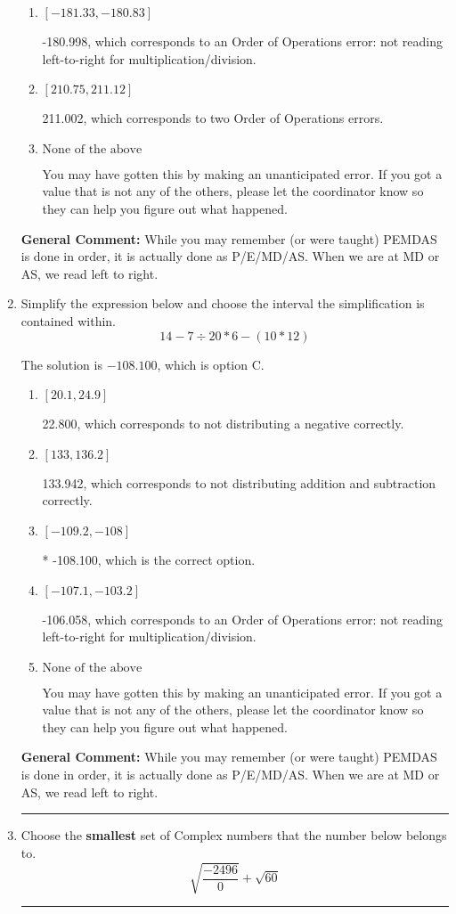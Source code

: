 \documentclass{extbook}[14pt]
\newcommand{\litem}[1]{\item #1

\rule{\textwidth}{0.4pt}}
\begin{document}
\begin{enumerate}
{\begin{enumerate}[label=\Alph*.]
* -180.338, this is the correct option
\item \( [-181.33, -180.83] \)

 -180.998, which corresponds to an Order of Operations error: not reading left-to-right for multiplication/division.
\item \( [210.75, 211.12] \)

 211.002, which corresponds to two Order of Operations errors.
\item \( \text{None of the above} \)

 You may have gotten this by making an unanticipated error. If you got a value that is not any of the others, please let the coordinator know so they can help you figure out what happened.
\end{enumerate}

\textbf{General Comment:} While you may remember (or were taught) PEMDAS is done in order, it is actually done as P/E/MD/AS. When we are at MD or AS, we read left to right.
}
\litem{
Simplify the expression below and choose the interval the simplification is contained within.
\[ 14 - 7 \div 20 * 6 - (10 * 12) \]

The solution is \( -108.100 \), which is option C.\begin{enumerate}[label=\Alph*.]
\item \( [20.1, 24.9] \)

 22.800, which corresponds to not distributing a negative correctly.
\item \( [133, 136.2] \)

 133.942, which corresponds to not distributing addition and subtraction correctly.
\item \( [-109.2, -108] \)

* -108.100, which is the correct option.
\item \( [-107.1, -103.2] \)

 -106.058, which corresponds to an Order of Operations error: not reading left-to-right for multiplication/division.
\item \( \text{None of the above} \)

 You may have gotten this by making an unanticipated error. If you got a value that is not any of the others, please let the coordinator know so they can help you figure out what happened.
\end{enumerate}

\textbf{General Comment:} While you may remember (or were taught) PEMDAS is done in order, it is actually done as P/E/MD/AS. When we are at MD or AS, we read left to right.
}
\litem{
Choose the \textbf{smallest} set of Complex numbers that the number below belongs to.
\[ \sqrt{\frac{-2496}{0}}+\sqrt{60} \]

}
\end{enumerate}
\end{document}
